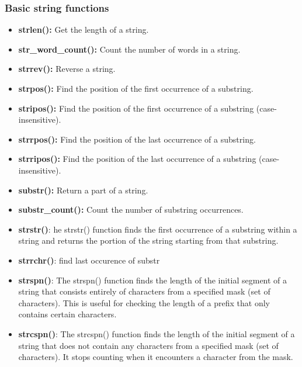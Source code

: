 \documentclass{report}
\begin{document}
\subsubsection{Basic string functions}
\bigbreak \noindent 
\begin{itemize}
    \item \textbf{strlen():} Get the length of a string.
    \item \textbf{str\_word\_count():} Count the number of words in a string.
    \item \textbf{strrev():} Reverse a string.
    \item \textbf{strpos():} Find the position of the first occurrence of a substring.
    \item \textbf{stripos():} Find the position of the first occurrence of a substring (case-insensitive).
    \item \textbf{strrpos():} Find the position of the last occurrence of a substring.
    \item \textbf{strripos():} Find the position of the last occurrence of a substring (case-insensitive).
    \item \textbf{substr():} Return a part of a string.
    \item \textbf{substr\_count():} Count the number of substring occurrences.
    \item \textbf{strstr()}: he strstr() function finds the first occurrence of a substring within a string and returns the portion of the string starting from that substring.
    \item \textbf{strrchr()}: find last occurence of substr
    \item \textbf{strspn()}: The strspn() function finds the length of the initial segment of a string that consists entirely of characters from a specified mask (set of characters). This is useful for checking the length of a prefix that only contains certain characters.
    \item \textbf{strcspn()}: The strcspn() function finds the length of the initial segment of a string that does not contain any characters from a specified mask (set of characters). It stops counting when it encounters a character from the mask.
\end{itemize}

\bigbreak \noindent 
\end{document}
